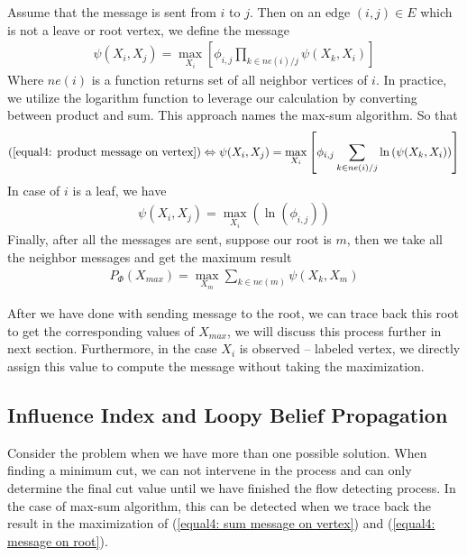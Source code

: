 Assume that the message is sent from $i$ to $j$. Then on an edge $(i,j) \in E$  which is not a leave or root vertex, we define the message
\begin{align}
\psi(X_i, X_j) = \max_{X_i} \left[ 
\phi_{i,j} \prod_{k \in ne(i)/j} {\psi(X_k, X_i)}
\right]
\label{equal4: product message on vertex}
\end{align}
Where $ne(i)$ is a function returns set of all neighbor vertices of $i$. In practice, we utilize the logarithm function to leverage our calculation by converting between product and sum. This approach names the max-sum algorithm. So that
\begin{align}
(\ref{equal4: product message on vertex}) \Leftrightarrow \psi(X_i, X_j) = \max_{X_i} \left[ 
\phi_{i,j} \sum_{k \in ne(i)/j} {\ln{(\psi(X_k, X_i))}}
\right]
\label{equal4: sum message on vertex}
\end{align}
In case of $i$ is a leaf, we have
\begin{align}
\psi(X_i, X_j) = \max_{X_i}{\left( \ln{(\phi_{i,j})} \right)}
\label{equal4: message on leaf}
\end{align}
Finally, after all the messages are sent, suppose our root is $m$, then we take all the neighbor messages and get the maximum result
\begin{align}
	P_\Phi(X_{max}) = \max_{X_m} {\sum_{k \in ne(m)}{\psi(X_k, X_m)}}
	\label{equal4: message on root}
\end{align}

After we have done with sending message to the root, we can trace back this root to get the corresponding values of $X_{max}$, we will discuss this process further in next section. Furthermore, in the case $X_i$ is observed -- labeled vertex, we directly assign this value to compute the message without taking the maximization.


\subsection{Influence Index and Loopy Belief Propagation}
\label{subsection: influence and loopy belief}
Consider the problem when we have more than one possible solution. When finding a minimum cut, we can not intervene in the process and can only determine the final cut value until we have finished the flow detecting process. In the case of max-sum algorithm, this can be detected when we trace back the result in the maximization of (\ref{equal4: sum message on vertex}) and (\ref{equal4: message on root}). 

